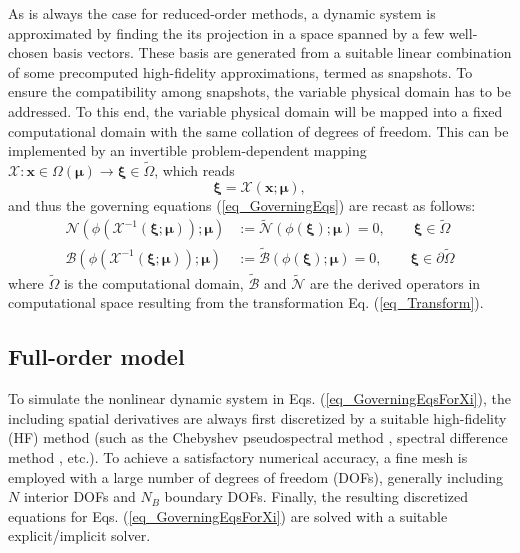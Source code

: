 \documentclass[preprint, 10pt]{elsarticle}
\begin{document}
As is always the case for reduced-order methods, a dynamic system is approximated by finding the its projection in a space spanned by a few well-chosen basis vectors. These basis are generated from a suitable linear combination of some precomputed high-fidelity approximations, termed as snapshots. To ensure the compatibility among snapshots, the variable physical domain has to be addressed. To this end, the variable physical domain will be mapped into a fixed computational domain with the same collation of degrees of freedom. This can be implemented by an invertible problem-dependent mapping $\mathcal{X} : \mathbf{x} \in \Omega\left(\pmb{\mu}\right) \to \pmb{ \xi} \in \widetilde \Omega$, which reads
\begin{equation}
\pmb{ \xi} = \mathcal{X} \left( \mathbf{x}; \pmb{\mu} \right),
\label{eq_Transform}
\end{equation}
and thus the governing equations (\ref{eq_GoverningEqs}) are recast as follows:
\begin{equation}
\begin{aligned}
\mathcal{N}\left(\phi\left( \mathcal{X}^{-1} \left( \pmb{ \xi}; \pmb{\mu} \right) \right); \pmb{\mu}\right)
&:=\widetilde {\mathcal{N}} \left(\phi\left( \pmb{ \xi} \right); \pmb{\mu}\right)
=0,  \qquad \pmb{ \xi} \in \widetilde \Omega
\\
\mathcal{B}\left(\phi\left(\mathcal{X}^{-1} \left( \pmb{ \xi}; \pmb{\mu} \right)\right); \pmb{\mu}\right)
&:=\widetilde {\mathcal{B}} \left(\phi\left( \pmb{ \xi} \right); \pmb{\mu}\right)
=0,  \qquad \pmb{ \xi} \in \partial \widetilde \Omega
\end{aligned}
\label{eq_GoverningEqsForXi}
\end{equation}
where $\widetilde \Omega$ is the computational domain, $\widetilde {\mathcal{B}}$ and $\widetilde {\mathcal{N}}$ are the derived operators in computational space resulting from the transformation Eq. (\ref{eq_Transform}).

\subsection{Full-order model}
To simulate the nonlinear dynamic system in Eqs. (\ref{eq_GoverningEqsForXi}), the including spatial derivatives are always first discretized by a suitable high-fidelity (HF) method (such as the Chebyshev pseudospectral method \cite{chen2018multidomain, chen2020parallel}, spectral difference method \cite{chen2020collocated}, etc.). To achieve a satisfactory numerical accuracy, a fine mesh is employed with a large number of degrees of freedom (DOFs), generally including $N$ interior DOFs and $N_B$ boundary DOFs. Finally, the resulting discretized equations for  Eqs. (\ref{eq_GoverningEqsForXi}) are solved with a suitable explicit/implicit solver.
\end{document}
